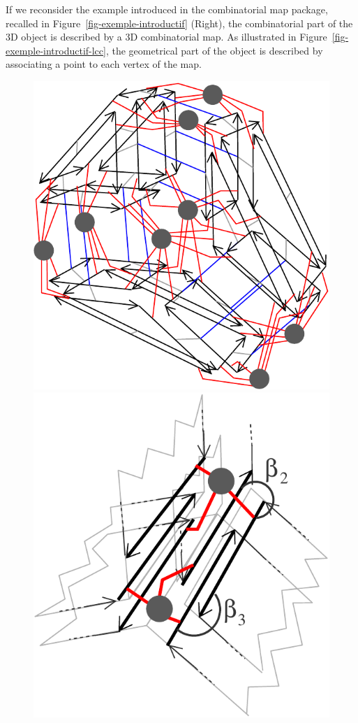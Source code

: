 %
If we reconsider the example introduced in the combinatorial map
package, recalled in Figure~\ref{fig-exemple-introductif} (Right), the
combinatorial part of the 3D object is described by a 3D combinatorial
map. As illustrated in Figure~\ref{fig-exemple-introductif-lcc}, the
geometrical part of the object is described by associating a point to
each vertex of the map.
%
\def\LargFig{.3\textwidth}
\begin{figure}[h]
  \begin{ccTexOnly}
    \begin{center}
      \includegraphics[width=\LargFig]{Linear_cell_complex/fig/pdf/intuitif-example-lcc}\qquad
      \includegraphics[width=\LargFig]{Linear_cell_complex/fig/pdf/intuitif-example-lcc-zoom}

\end{center}
\end{ccTexOnly}
\end{figure}
